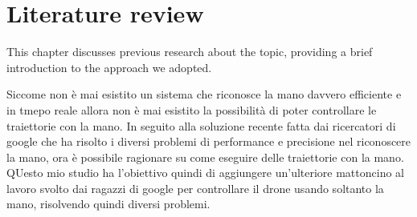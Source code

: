 \setcounter{chapter}{0}
\chapter{Literature review}
\label{chap:stateoftheart}
This chapter discusses previous research about the topic, providing a brief 
introduction to the approach we adopted.


\bigskip
Siccome non è mai esistito un sistema che riconosce la mano davvero efficiente e in tmepo reale allora non è mai esistito la possibilità di poter controllare le traiettorie con la mano. In seguito alla soluzione recente fatta dai ricercatori di google che ha risolto i diversi problemi di performance e precisione nel riconoscere la mano, ora è possibile ragionare su come eseguire delle traiettorie con la mano. QUesto mio studio ha l'obiettivo quindi di aggiungere un'ulteriore mattoncino al lavoro svolto dai ragazzi di google per controllare il drone usando soltanto la mano, risolvendo quindi diversi problemi.